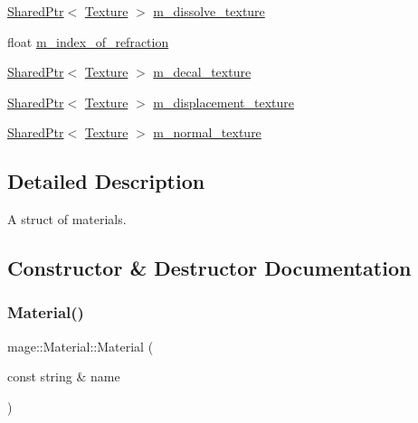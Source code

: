 \begin{DoxyCompactItemize}
\item 
\hyperlink{namespacemage_a1e01ae66713838a7a67d30e44c67703e}{Shared\+Ptr}$<$ \hyperlink{classmage_1_1_texture}{Texture} $>$ \hyperlink{structmage_1_1_material_aa68e02ed3da6000effc3aadcc99fa4b5}{m\+\_\+dissolve\+\_\+texture}
\item 
float \hyperlink{structmage_1_1_material_a8b584541ab8bfc527f856c68bb0152e7}{m\+\_\+index\+\_\+of\+\_\+refraction}
\item 
\hyperlink{namespacemage_a1e01ae66713838a7a67d30e44c67703e}{Shared\+Ptr}$<$ \hyperlink{classmage_1_1_texture}{Texture} $>$ \hyperlink{structmage_1_1_material_acdab45e5d78ddbb7f717d9db67ff3fcf}{m\+\_\+decal\+\_\+texture}
\item 
\hyperlink{namespacemage_a1e01ae66713838a7a67d30e44c67703e}{Shared\+Ptr}$<$ \hyperlink{classmage_1_1_texture}{Texture} $>$ \hyperlink{structmage_1_1_material_a04ca0a2efe12529ae0ea91e9cb622ade}{m\+\_\+displacement\+\_\+texture}
\item 
\hyperlink{namespacemage_a1e01ae66713838a7a67d30e44c67703e}{Shared\+Ptr}$<$ \hyperlink{classmage_1_1_texture}{Texture} $>$ \hyperlink{structmage_1_1_material_a18e56785d5ca3ae5a9b99c64e70622d6}{m\+\_\+normal\+\_\+texture}
\end{DoxyCompactItemize}


\subsection{Detailed Description}
A struct of materials. 

\subsection{Constructor \& Destructor Documentation}
\hypertarget{structmage_1_1_material_a0307d3bcf53c6ba270c8be4d127298db}{}\label{structmage_1_1_material_a0307d3bcf53c6ba270c8be4d127298db} 
\subsubsection{\texorpdfstring{Material()}{Material()}\hspace{0.1cm}{\footnotesize\ttfamily [1/3]}}
{\footnotesize\ttfamily mage\+::\+Material\+::\+Material (\begin{DoxyParamCaption}\item[{const string \&}]{name }\end{DoxyParamCaption})\hspace{0.3cm}{\ttfamily [explicit]}}

